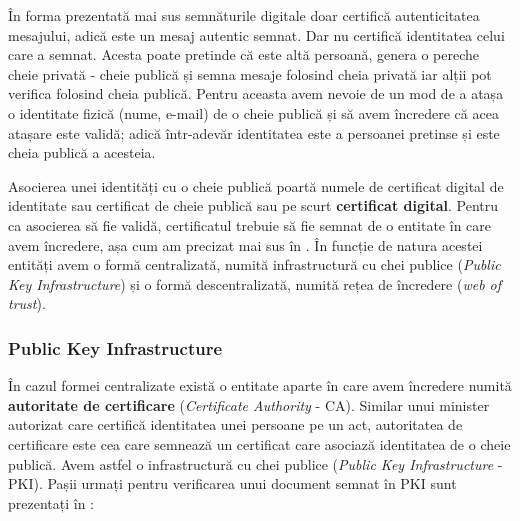 În forma prezentată mai sus semnăturile digitale doar certifică autenticitatea mesajului, adică este un mesaj autentic semnat.
Dar nu certifică identitatea celui care a semnat.
Acesta poate pretinde că este altă persoană, genera o pereche cheie privată - cheie publică și semna mesaje folosind cheia privată iar alții pot verifica folosind cheia publică.
Pentru aceasta avem nevoie de un mod de a atașa o identitate fizică (nume, e-mail) de o cheie publică și să avem încredere că acea atașare este validă;
adică într-adevăr identitatea este a persoanei pretinse și este cheia publică a acesteia.

Asocierea unei identități cu o cheie publică poartă numele de certificat digital de identitate sau certificat de cheie publică sau pe scurt \textbf{certificat digital}.
Pentru ca asocierea să fie validă, certificatul trebuie să fie semnat de o entitate în care avem încredere, așa cum am precizat mai sus în .
În funcție de natura acestei entități avem o formă centralizată, numită infrastructură cu chei publice (\textit{Public Key Infrastructure}) și o formă descentralizată, numită rețea de încredere (\textit{web of trust}).

\subsubsection{Public Key Infrastructure}
\label{sec:sec:transfer:sign:pki}

În cazul formei centralizate există o entitate aparte în care avem încredere numită \textbf{autoritate de certificare} (\textit{Certificate Authority} - CA).
Similar unui minister autorizat care certifică identitatea unei persoane pe un act, autoritatea de certificare este cea care semnează un certificat care asociază identitatea de o cheie publică.
Avem astfel o infrastructură cu chei publice (\textit{Public Key Infrastructure} - PKI).
Pașii urmați pentru verificarea unui document semnat în PKI sunt prezentați în :

